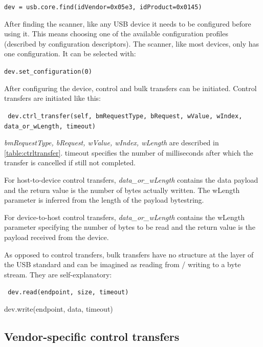 \documentclass{article}
\begin{document}
\begin{center}
\tt dev = usb.core.find(idVendor=0x05e3, idProduct=0x0145)
\end{center}

After finding the scanner, like any USB device it needs to be configured
before using it. This means choosing one of the available configuration
profiles (described by configuration descriptors). The scanner, like most
devices, only has one configuration. It can be selected with:

\begin{center}
\tt dev.set\_configuration(0)
\end{center}

After configuring the device, control and bulk transfers can be initiated.
Control transfers are initiated like this:

\begin{center}
\tt
dev.ctrl\_transfer(self, bmRequestType, bRequest, wValue, wIndex, data\_or\_wLength, timeout)
\end{center}

{\it bmRequestType, bRequest, wValue, wIndex, wLength} are described in \autoref{table:ctrltransfer}.
timeout specifies the number of milliseconds after which the transfer is cancelled if
still not completed.

For host-to-device control transfers, {\it data\_or\_wLength} contains the data payload
and the return value is the number of bytes actually written. The wLength parameter
is inferred from the length of the payload bytestring.

For device-to-host control transfers, {\it data\_or\_wLength} contains the wLength
parameter specifying the number of bytes to be read and the return value is the payload
received from the device.

As opposed to control transfers, bulk transfers have no structure at the layer
of the USB standard and can be imagined as reading from / writing to a byte stream.
They are self-explanatory:

\begin{center}
\tt
dev.read(endpoint, size, timeout)

dev.write(endpoint, data, timeout)
\end{center}

\subsection{Vendor-specific control transfers}
\end{document}

